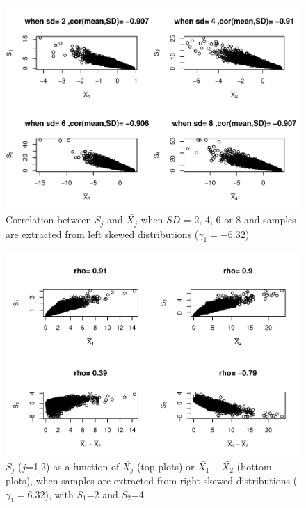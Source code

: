 \documentclass[
  english,
  man,mask]{apa6}
\begin{document}
\begin{figure}
\centering
\includegraphics{Correlation_files/figure-latex/Hetbalcorasafctofn2-1.pdf}
\caption{\label{fig:Hetbalcorasafctofn2}Correlation between \(S_j\) and \(\bar{X_j}\) when \(SD\) = 2, 4, 6 or 8 and samples are extracted from left skewed distributions (\(\gamma_1 = -6.32\))}
\end{figure}

\begin{figure}
\centering
\includegraphics{Correlation_files/figure-latex/pltSDHetbalRskew-1.pdf}
\caption{\label{fig:pltSDHetbalRskew}\(S_j\) (\(j\)=1,2) as a function of \(\bar{X_j}\) (top plots) or \(\bar{X_1}-\bar{X_2}\) (bottom plots), when samples are extracted from right skewed distributions (\(\gamma_1 = 6.32\)), with \(S_1\)=2 and \(S_2\)=4}
\end{figure}
\end{document}

